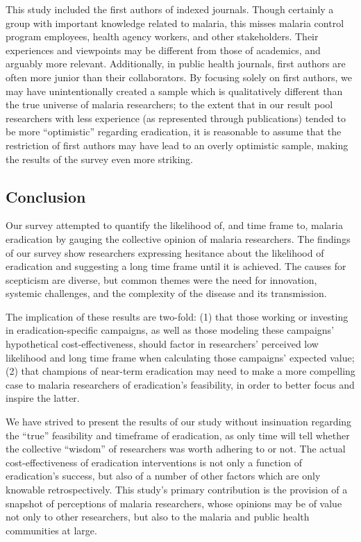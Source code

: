\documentclass[]{article}
\begin{document}
This study included the first authors of indexed journals. Though
certainly a group with important knowledge related to malaria, this
misses malaria control program employees, health agency workers, and
other stakeholders. Their experiences and viewpoints may be different
from those of academics, and arguably more relevant. Additionally, in
public health journals, first authors are often more junior than their
collaborators. By focusing solely on first authors, we may have
unintentionally created a sample which is qualitatively different than
the true universe of malaria researchers; to the extent that in our
result pool researchers with less experience (as represented through
publications) tended to be more ``optimistic'' regarding eradication, it
is reasonable to assume that the restriction of first authors may have
lead to an overly optimistic sample, making the results of the survey
even more striking.

\subsection{Conclusion}\label{conclusion}

Our survey attempted to quantify the likelihood of, and time frame to,
malaria eradication by gauging the collective opinion of malaria
researchers. The findings of our survey show researchers expressing
hesitance about the likelihood of eradication and suggesting a long time
frame until it is achieved. The causes for scepticism are diverse, but
common themes were the need for innovation, systemic challenges, and the
complexity of the disease and its transmission.

The implication of these results are two-fold: (1) that those working or
investing in eradication-specific campaigns, as well as those modeling
these campaigns' hypothetical cost-effectiveness, should factor in
researchers' perceived low likelihood and long time frame when
calculating those campaigns' expected value; (2) that champions of
near-term eradication may need to make a more compelling case to malaria
researchers of eradication's feasibility, in order to better focus and
inspire the latter.

We have strived to present the results of our study without insinuation
regarding the ``true'' feasibility and timeframe of eradication, as only
time will tell whether the collective ``wisdom'' of researchers was
worth adhering to or not. The actual cost-effectiveness of eradication
interventions is not only a function of eradication's success, but also
of a number of other factors which are only knowable retrospectively.
This study's primary contribution is the provision of a snapshot of
perceptions of malaria researchers, whose opinions may be of value not
only to other researchers, but also to the malaria and public health
communities at large.
\end{document}
